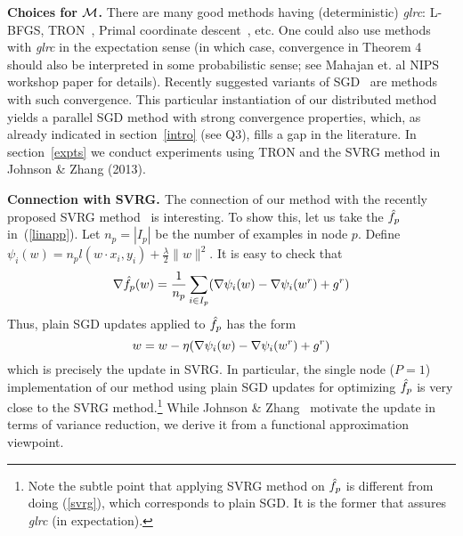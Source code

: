 {\bf Choices for ${\cal M}$.}
There are many good methods having (deterministic) {\it glrc}: L-BFGS, TRON~\cite{lin2008}, Primal coordinate descent~\cite{chang2008}, etc. One could also use methods with {\it glrc} in the expectation sense (in which case, convergence in Theorem 4 should also be interpreted in some probabilistic sense; see Mahajan et. al NIPS workshop paper for details). Recently suggested variants of SGD~\cite{leroux2012,johnson2013} are methods with such convergence. This particular instantiation of our distributed method yields a parallel SGD method with strong convergence properties, which, as already indicated in section~\ref{intro} (see Q3), fills a gap in the literature. In section~\ref{expts} we conduct experiments using TRON and the SVRG method in Johnson \& Zhang (2013).

{\bf{Connection with SVRG. }}
The connection of our method with the recently proposed SVRG method~\citep{johnson2013} is interesting. To show this, let us take the $\hat{f}_p$ in~(\ref{linapp}). Let $n_p=|I_p|$ be the number of examples in node $p$. Define $\psi_i(w) = n_p l(w\cdot x_i,y_i) + \frac{\lambda}{2} \|w\|^2$. It is easy to check that
\begin{equation}
\nabla\hat{f}_p(w) = \frac{1}{n_p} \sum_{i\in I_p} ( \nabla\psi_i(w) - \nabla\psi_i(w^r) + g^r)
\label{psigrad}
\end{equation}
Thus, plain SGD updates applied to $\hat{f}_p$ has the form
\begin{equation}
w = w - \eta ( \nabla\psi_i(w) - \nabla\psi_i(w^r) + g^r)
\label{svrg}
\end{equation}
which is precisely the update in SVRG. In particular, the single node ($P=1$) implementation of our method using plain SGD updates for optimizing $\hat{f}_p$ is very close to the SVRG method.\footnote{Note the subtle point that applying SVRG method on $\hat{f}_p$ is different from doing (\ref{svrg}), which corresponds to plain SGD. It is the former that assures {\it glrc} (in expectation).} While Johnson \& Zhang~ motivate the update in terms of variance reduction, we derive it from a functional approximation viewpoint.

